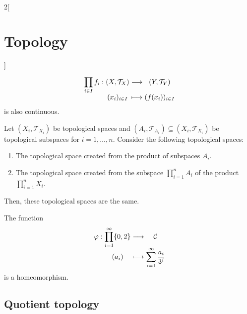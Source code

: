 \documentclass[../../../main.tex]{subfiles}
\begin{document}
\begin{multicols}{2}[\section{Topology}]
\begin{prop}
    $$
      \function{\displaystyle\prod_{i\in I}f_i}{\left(X,\mathcal{T}_X\right)}{\left(Y,\mathcal{T}_Y\right)}{(x_i)_{i\in I}}{(f(x_i))_{i\in I}}
    $$ is also continuous.
  \end{prop}
  \begin{prop}
    Let $(X_i,\mathcal{T}_{X_i})$ be topological spaces and $(A_i,\mathcal{T}_{A_i})\subseteq (X_i,\mathcal{T}_{X_i})$ be topological subspaces for $i=1,\ldots, n$. Consider the following topological spaces:
    \begin{enumerate}
      \item The topological space created from the product of subspaces $A_i$.
      \item The topological space created from the subspace $\prod_{i=1}^nA_i$ of the product $\prod_{i=1}^nX_i$.
    \end{enumerate}
    Then, these topological spaces are the same.
  \end{prop}
  \begin{theorem}
    The function
    $$
      \function{\varphi}{\displaystyle\prod_{i=1}^\infty\{0,2\}}{\mathcal{C}}{(a_i)}{\displaystyle\sum_{i=1}^\infty\frac{a_i}{3^i}}
    $$
    is a homeomorphism.
  \end{theorem}
  \subsection{Quotient topology}

\end{multicols}
\end{document}
